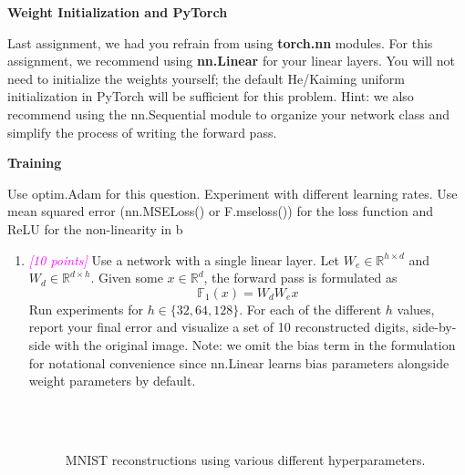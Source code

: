 \documentclass{article}
\newcommand{\field}[1]{\mathbb{#1}}
\newcommand{\1}{\mathbf{1}}
\newcommand{\R}{\field{R}} %
\newcommand{\F}{\field{F}} %
\newcommand{\points}[1]{\small\textcolor{magenta}{\emph{[#1 points]}} \normalsize}
\begin{document}
\textbf{Weight Initialization and PyTorch}

Last assignment, we had you refrain from using \textbf{torch.nn} modules. For this assignment, we recommend using \textbf{nn.Linear} for your linear layers. You will not need to initialize the weights yourself; the default He/Kaiming uniform initialization in PyTorch will be sufficient for this problem. Hint: we also recommend using the nn.Sequential module to organize your network class and simplify the process of writing the forward pass. 

\textbf{Training}

Use optim.Adam for this question. Experiment with different learning rates. Use mean squared error (nn.MSELoss() or F.mseloss()) for the loss function and ReLU for the non-linearity in b

\begin{enumerate}
    \item \points{10} Use a network with a single linear layer. Let $W_e\in\R^{h\times d}$ and $W_d\in\R^{d\times h}$. Given some $x\in\R^d$, the forward pass is formulated as 
    $$\F_1(x) =W_dW_ex$$
    Run experiments for $h\in \{32,64,128\}$. For each of the different $h$ values, report your  final error and visualize a set of 10 reconstructed digits, side-by-side with the original image. Note: we omit the bias term in the formulation for notational convenience since nn.Linear learns bias parameters alongside weight parameters by default. \\
    \begin{figure}[h!]
        \centering 
        \\
        \\
        \caption{MNIST reconstructions using various different hyperparameters.}
    \end{figure}
    

\end{enumerate}
\end{document}
